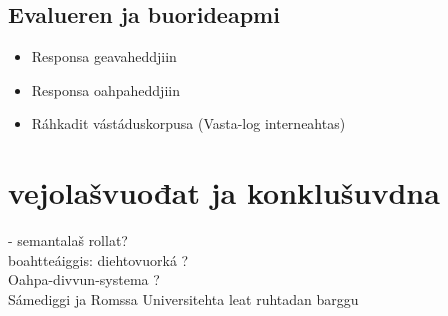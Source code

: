 \documentclass[a4paper,14pt]{article}
\begin{document}
\subsection{Evalueren ja buorideapmi}
\begin{itemize}
\item Responsa geavaheddjiin
\item Responsa oahpaheddjiin
\item Ráhkadit vástáduskorpusa (Vasta-log interneahtas)
\end{itemize}

\section{vejolašvuođat ja konklušuvdna}
- semantalaš rollat? \\
boahtteáiggis: diehtovuorká ? \\
Oahpa-divvun-systema ? \\
Sámediggi ja Romssa Universitehta leat ruhtadan barggu


\newpage

\par


\end{document}
